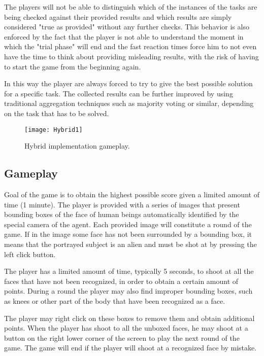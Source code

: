 The players will not be able to distinguish which of the instances of the tasks
are being checked against their provided results and which results are simply
considered "true as provided" without any further checks. This behavior is also
enforced by the fact that the player is not able to understand the moment in which
the "trial phase" will end and the fast reaction times force him to not even have
the time to think about providing misleading results, with the risk of having to
start the game from the beginning again.

In this way the player are always forced to try to give the best possible solution
for a specific task. The collected results can be further improved by using
traditional aggregation techniques such as majority voting or similar, depending
on the task that has to be solved.

\begin{figure}[htb]
    \centering
    \texttt{[image: Hybrid1]}
    \caption{Hybrid implementation gameplay.}
    \label{fig:Hybrid2}
\end{figure}

\subsection{Gameplay}
Goal of the game is to obtain the highest possible score given a limited amount
of time (1 minute). The player is provided with a series of images that present
bounding boxes of the face of human beings automatically identified by the special
camera of the agent. Each provided image will constitute a round of the game. If
in the image some face has not been surrounded by a bounding box, it means that
the portrayed subject is an alien and must be shot at by pressing the left click
button.

The player has a limited amount of time, typically 5 seconds, to shoot at all the
faces that have not been recognized, in order to obtain a certain amount of points.
During a round the player may also find improper bounding boxes, such as knees or
other part of the body that have been recognized as a face.

The player may right click on these boxes to remove them and obtain additional
points. When the player has shoot to all the unboxed faces, he may shoot at a
button on the right lower corner of the screen to play the next round of the game.
The game will end if the player will shoot at a recognized face by mistake.


